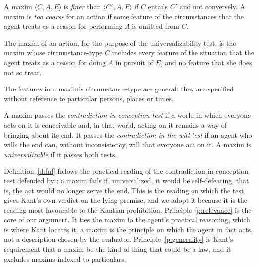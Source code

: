 \documentclass{situationist-preprint}
\begin{document}
\begin{definition}[Fineness]\label{d:fine}
A maxim $\langle C, A, E\rangle$ is \emph{finer} than $\langle C', A, E\rangle$ if $C$ entails $C'$ and not conversely. A maxim is \emph{too coarse} for an action if some feature of the circumstances that the agent treats as a reason for performing $A$ is omitted from $C$.
\end{definition}

\begin{principle}[Relevance]\label{p:relevance}
The maxim of an action, for the purpose of the universalizability test, is the maxim whose circumstance-type $C$ includes every feature of the situation that the agent treats as a reason for doing $A$ in pursuit of $E$, and no feature that she does not so treat.
\end{principle}

\begin{principle}[Generality]\label{p:generality}
The features in a maxim's circumstance-type are general: they are specified without reference to particular persons, places or times.
\end{principle}

\begin{definition}[Universalizability]\label{d:ful}
A maxim passes the \emph{contradiction in conception test} if a world in which everyone acts on it is conceivable and, in that world, acting on it remains a way of bringing about its end. It passes the \emph{contradiction in the will test} if an agent who wills the end can, without inconsistency, will that everyone act on it. A maxim is \emph{universalizable} if it passes both tests.
\end{definition}

Definition~\ref{d:ful} follows the practical reading of the contradiction in conception test defended by \citet{Korsgaard1985}: a maxim fails if, universalized, it would be self-defeating, that is, the act would no longer serve the end. This is the reading on which the test gives Kant's own verdict on the lying promise, and we adopt it because it is the reading most favourable to the Kantian prohibition. Principle~\ref{p:relevance} is the core of our argument. It ties the maxim to the agent's practical reasoning, which is where Kant locates it: a maxim is the principle on which the agent in fact acts, not a description chosen by the evaluator. Principle~\ref{p:generality} is Kant's requirement that a maxim be the kind of thing that could be a law, and it excludes maxims indexed to particulars.
\end{document}
